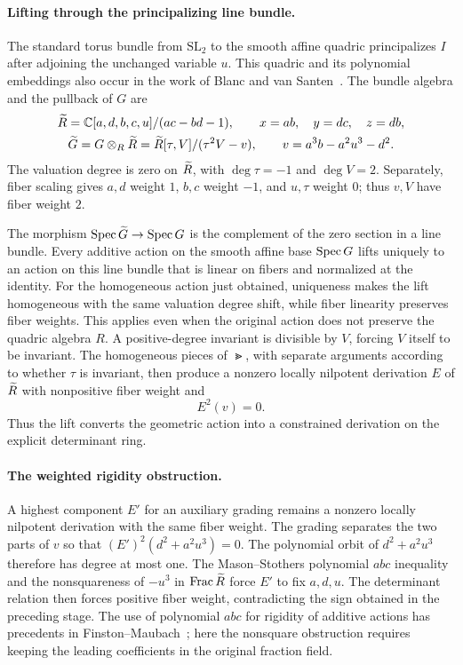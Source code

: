 \paragraph{Lifting through the principalizing line bundle.}
The standard torus bundle from $\mathrm{SL}_2$ to the smooth affine
quadric principalizes $I$ after adjoining the unchanged variable $u$.
This quadric and its polynomial embeddings also occur in the work of
Blanc and van Santen~\cite{BlancVanSanten}. The bundle algebra and
the pullback of $G$ are
\[
 \begin{gathered}
 \widetilde R=\mathbb C[a,d,b,c,u]/(ac-bd-1),\qquad
 x=ab,\quad y=dc,\quad z=db,\\
 \widetilde G=G\otimes_R\widetilde R
     =\widetilde R[\tau,V]/(\tau^2V-v),\qquad
 v=a^3b-a^2u^3-d^2.
 \end{gathered}
\]
The valuation degree is zero on $\widetilde R$, with $\deg\tau=-1$ and
$\deg V=2$. Separately, fiber scaling gives $a,d$ weight $1$,
$b,c$ weight $-1$, and $u,\tau$ weight $0$; thus $v,V$ have
fiber weight $2$.

The morphism $\operatorname{Spec}\widetilde G\to\operatorname{Spec} G$ is the complement of the zero
section in a line bundle. Every additive action on the smooth affine
base $\operatorname{Spec} G$ lifts uniquely to an action on this line bundle that is
linear on fibers and
normalized at the identity. For the homogeneous action just obtained,
uniqueness makes the lift homogeneous with the same valuation degree
shift, while fiber linearity preserves fiber weights. This applies even
when the original action does not preserve the quadric algebra $R$.
A positive-degree invariant is divisible by $V$, forcing
$V$ itself to be invariant. The homogeneous pieces of $\Gt$, with
separate arguments according to whether $\tau$ is invariant, then
produce a nonzero locally nilpotent derivation $E$ of $\widetilde R$ with
nonpositive fiber weight and
\[
 E^2(v)=0.
\]
Thus the lift converts the geometric action into a constrained
derivation on the explicit determinant ring.

\paragraph{The weighted rigidity obstruction.}
A highest component $E'$ for an auxiliary grading remains a nonzero
locally nilpotent derivation with the same fiber weight. The grading
separates the two parts of $v$ so that $(E')^2(d^2+a^2u^3)=0$.
The polynomial orbit of $d^2+a^2u^3$ therefore has degree at most one.
The Mason--Stothers polynomial $abc$ inequality~\cite{Mason,Stothers}
and the nonsquareness of $-u^3$ in $\operatorname{Frac}\widetilde R$ force $E'$ to fix
$a,d,u$. The determinant relation then forces positive fiber weight,
contradicting the sign obtained in the preceding stage.
The use of polynomial $abc$ for rigidity of additive actions has
precedents in Finston--Maubach~\cite[Section~2]{FinstonMaubach}; here
the nonsquare obstruction requires keeping the leading coefficients
in the original fraction field.

